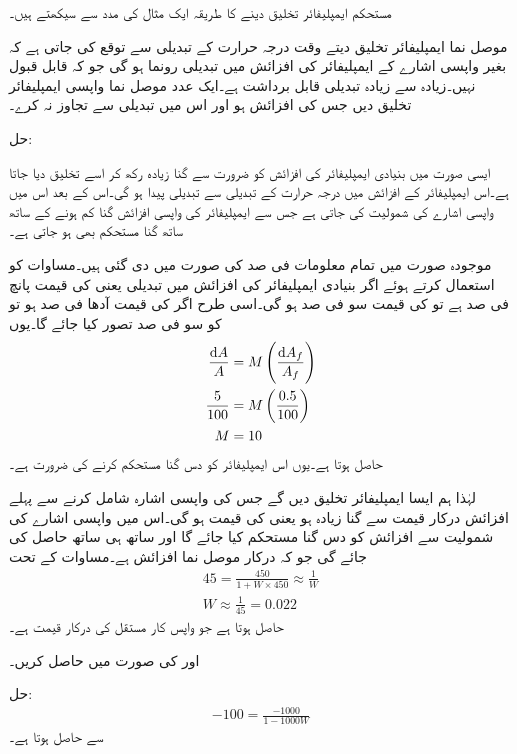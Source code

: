 مستحکم ایمپلیفائر تخلیق دینے کا طریقہ ایک مثال کی مدد سے سیکھتے ہیں۔

موصل نما ایمپلیفائر تخلیق دیتے وقت درجہ حرارت کے تبدیلی سے توقع کی جاتی ہے کہ بغیر واپسی اشارے کے ایمپلیفائر کی افزائش میں  تبدیلی رونما ہو گی جو کہ قابل قبول نہیں۔زیادہ سے
 زیادہ  تبدیلی قابل برداشت ہے۔ایک عدد موصل نما واپسی ایمپلیفائر تخلیق دیں جس کی افزائش  ہو اور اس میں تبدیلی  سے تجاوز نہ کرے۔

حل: 

ایسی صورت میں بنیادی ایمپلیفائر کی افزائش  کو ضرورت سے  گنا زیادہ رکھ کر اسے تخلیق دیا جاتا ہے۔اس ایمپلیفائر کے افزائش میں درجہ حرارت کے تبدیلی سے  تبدیلی پیدا ہو گی۔اس کے بعد اس میں واپسی اشارے کی شمولیت کی جاتی ہے جس سے ایمپلیفائر کی واپسی افزائش  گنا کم ہونے کے ساتھ ساتھ  گنا مستحکم بھی ہو جاتی ہے۔

موجودہ صورت میں تمام معلومات فی صد کی صورت میں دی گئی ہیں۔مساوات  کو استعمال کرتے ہوئے اگر بنیادی ایمپلیفائر کی افزائش میں تبدیلی یعنی   کی قیمت پانچ فی صد ہے تو  کی قیمت سو فی صد ہو گی۔اسی طرح اگر   کی قیمت  آدھا فی صد ہو تو  کو سو فی صد تصور کیا جائے گا۔یوں
\begin{align*}
\frac{\textup{d}A}{A} &=M  \left (\frac{\textup{d}A_f}{A_f} \right)\\
\frac{5}{100}&=M \left (\frac{0.5}{100} \right)\\
M &=10
\end{align*}
حاصل ہوتا ہے۔یوں اس ایمپلیفائر کو دس گنا مستحکم کرنے کی ضرورت ہے۔

لہٰذا ہم ایسا  ایمپلیفائر تخلیق دیں گے جس کی واپسی اشارہ شامل کرنے سے پہلے افزائش درکار قیمت سے   گنا زیادہ ہو  یعنی  کی قیمت  ہو گی۔اس میں واپسی اشارے کی شمولیت سے افزائش کو دس گنا مستحکم کیا جائے گا اور ساتھ ہی ساتھ  حاصل کی جائے گی جو کہ درکار موصل نما افزائش ہے۔مساوات  کے تحت
\begin{align*}
45 =\frac{450}{1+W \times 450}\approx \frac{1}{W} \\
W \approx \frac{1}{45}=\num{0.022}
\end{align*}
حاصل ہوتا ہے جو  واپس کار   مستقل کی درکار قیمت ہے۔

 اور  کی صورت میں  حاصل کریں۔

حل:
\begin{align*}
-100 = \frac{-1000}{1-1000 W}
\end{align*}
سے   حاصل ہوتا ہے۔

